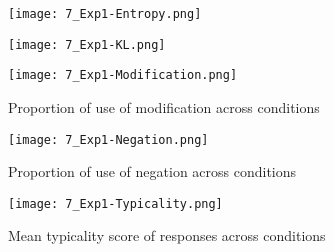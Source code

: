 \documentclass[output=paper,colorlinks,citecolor=brown]{langscibook}
\begin{document}
\begin{figure}
    \centering
    \begin{minipage}{0.5\textwidth}
        \centering
        \texttt{[image: 7\_Exp1-Entropy.png]} %
        \label{Exp1Entropy}
    \end{minipage}\hfill
    \begin{minipage}{0.5\textwidth}
        \centering
        \texttt{[image: 7\_Exp1-KL.png]} %
        \label{Exp1KL}
    \end{minipage}
\end{figure}

\begin{figure}%
    \begin{floatrow}
    \ffigbox
    {\texttt{[image: 7\_Exp1-Modification.png]}}
    {\caption{Proportion of use of modification across conditions}\label{Exp1Mod}}
    \ffigbox
    {\texttt{[image: 7\_Exp1-Negation.png]}}
    {\caption{Proportion of use of negation across conditions}\label{Exp1Neg}}
    \end{floatrow}
\end{figure}

\begin{figure}%
    \texttt{[image: 7\_Exp1-Typicality.png]}
    \caption{Mean typicality score of responses across conditions}\label{Exp1Typ}
\end{figure}
\end{document}

